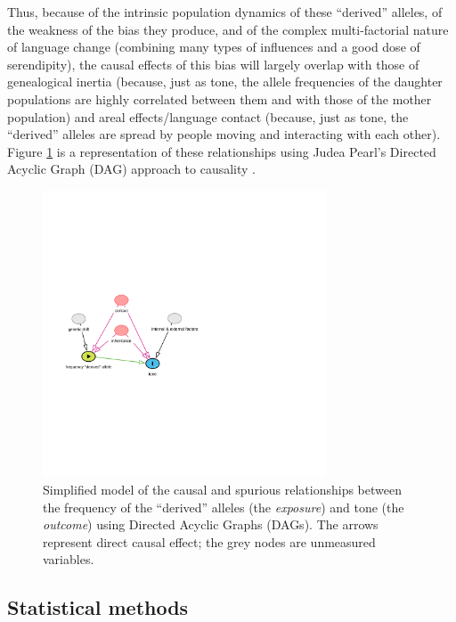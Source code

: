 \documentclass[twoside,onecolumn]{article}
\begin{document}
Thus, because of the intrinsic population dynamics of these ``derived'' alleles, of the weakness of the bias they produce, and of the complex multi-factorial nature of language change (combining many types of influences and a good dose of serendipity), the causal effects of this bias will largely overlap with those of genealogical inertia (because, just as tone, the allele frequencies of the daughter populations are highly correlated between them and with those of the mother population) and areal effects/language contact (because, just as tone, the ``derived'' alleles are spread by people moving and interacting with each other).
Figure \ref{Fig:dag_tone_genes} is a representation of these relationships using Judea Pearl's Directed Acyclic Graph (DAG) approach to causality \citep{pearl_causality_2000,pearl_why_2018,mcelreath_statistical_2020}.

\begin{figure}[h]
  \centering
  \includegraphics[width=0.75\textwidth]{dag_tone_genes}
  \caption{Simplified model of the causal and spurious relationships between the frequency of the ``derived'' alleles (the \textit{exposure}) and tone (the \textit{outcome}) using Directed Acyclic Graphs (DAGs). The arrows represent direct causal effect; the grey nodes are unmeasured variables.}
  \label{Fig:dag_tone_genes}
\end{figure}


\subsection{Statistical methods}
\end{document}
